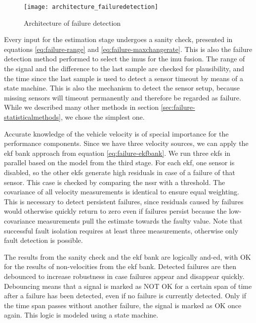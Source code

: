 \begin{figure}
	\centering
	\texttt{[image: architecture\_failuredetection]}%
	\caption{Architecture of failure detection}
	\label{fig:architecture-failuredetection}
\end{figure}

Every input for the estimation stage undergoes a sanity check, presented in equations \ref{eq:failure-range} and \ref{eq:failure-maxchangerate}. This is also the failure detection method performed to select the \glspl{imu} for the \gls{imu} fusion. The range of the signal and the difference to the last sample are checked for plausibility, and the time since the last sample is used to detect a sensor timeout by means of a state machine. This is also the mechanism to detect the sensor setup, because missing sensors will timeout permanently and therefore be regarded as failure. While we described many other methods in section \ref{sec:failure-statisticalmethods}, we chose the simplest one.

Accurate knowledge of the vehicle velocity is of special importance for the performance components. Since we have three velocity sources, we can apply the \gls{ekf} bank approach from equation \ref{eq:failure-ekfbank}. We run three \glspl{ekf} in parallel based on the model from the third stage. For each \gls{ekf}, one sensor is disabled, so the other \glspl{ekf} generate high residuals in case of a failure of that sensor. This case is checked by comparing the \gls{nssr} with a threshold. The covariance of all velocity measurements is identical to ensure equal weighting. This is necessary to detect persistent failures, since residuals caused by failures would otherwise quickly return to zero even if failures persist because the low-covariance measurements pull the estimate towards the faulty value. Note that successful fault isolation requires at least three measurements, otherwise only fault detection is possible.

The results from the sanity check and the \gls{ekf} bank are logically and-ed, with OK for the results of non-velocities from the \gls{ekf} bank. Detected failures are then debounced to increase robustness in case failures appear and disappear quickly. Debouncing means that a signal is marked as NOT OK for a certain span of time after a failure has been detected, even if no failure is currently detected. Only if the time span passes without another failure, the signal is marked as OK once again. This logic is modeled using a state machine.

